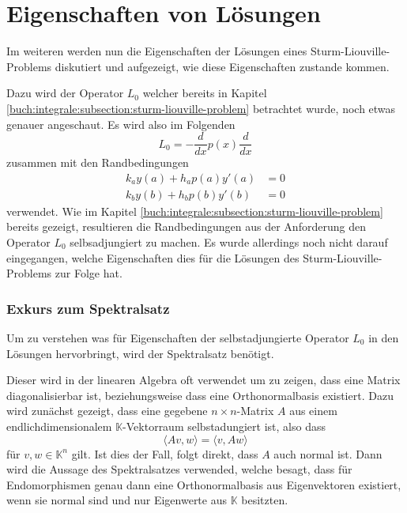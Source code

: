 %
%
%
\section{Eigenschaften von Lösungen
\label{sturmliouville:section:solution-properties}}

Im weiteren werden nun die Eigenschaften der Lösungen eines
Sturm-Liouville-Problems diskutiert und aufgezeigt, wie diese Eigenschaften
zustande kommen.

Dazu wird der Operator $L_0$ welcher bereits in Kapitel
\ref{buch:integrale:subsection:sturm-liouville-problem} betrachtet wurde,
noch etwas genauer angeschaut. Es wird also im Folgenden
\[
    L_0
    =
    -\frac{d}{dx}p(x)\frac{d}{dx}
\]
zusammen mit den Randbedingungen
\[
    \begin{aligned}
        k_a y(a) + h_a p(a) y'(a) &= 0 \\
        k_b y(b) + h_b p(b) y'(b) &= 0
    \end{aligned}
\]
verwendet. Wie im Kapitel
\ref{buch:integrale:subsection:sturm-liouville-problem} bereits gezeigt,
resultieren die Randbedingungen aus der Anforderung den Operator $L_0$
selbsadjungiert zu machen.
Es wurde allerdings noch nicht darauf eingegangen, welche Eigenschaften dies
für die Lösungen des Sturm-Liouville-Problems zur Folge hat.

\subsubsection{Exkurs zum Spektralsatz}

Um zu verstehen was für Eigenschaften der selbstadjungierte Operator $L_0$ in 
den Lösungen hervorbringt, wird der Spektralsatz benötigt.

Dieser wird in der linearen Algebra oft verwendet um zu zeigen, dass eine Matrix
diagonalisierbar ist, beziehungsweise dass eine Orthonormalbasis existiert.
Dazu wird zunächst gezeigt, dass eine gegebene $n\times n$-Matrix $A$ aus einem
endlichdimensionalem $\mathbb{K}$-Vektorraum selbstadungiert ist, also dass
\[
    \langle Av, w \rangle
    =
    \langle v, Aw \rangle
\]
für $ v, w \in \mathbb{K}^n$ gilt.
Ist dies der Fall, folgt direkt, dass $A$ auch normal ist.
Dann wird die Aussage des Spektralsatzes verwended, welche besagt, dass für
Endomorphismen genau dann eine Orthonormalbasis aus Eigenvektoren existiert,
wenn sie normal sind und nur Eigenwerte aus $\mathbb{K}$ besitzten.

